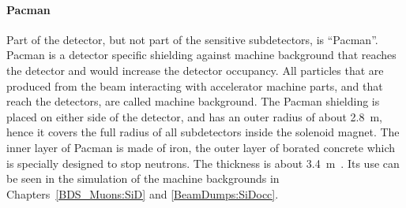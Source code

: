 \paragraph{Pacman}
Part of the detector, but not part of the sensitive subdetectors, is ``Pacman''.
Pacman is a detector specific shielding against machine background that reaches the detector and would increase the detector occupancy.
All particles that are produced from the beam interacting with accelerator machine parts, and that reach the detectors, are called machine background.
The Pacman shielding is placed on either side of the detector, and has an outer radius of about \SI{2.8}{\meter}, hence it covers the full radius of all subdetectors inside the solenoid magnet.
The inner layer of Pacman is made of iron, the outer layer of borated concrete which is specially designed to stop neutrons.
The thickness is about \SI{3.4}{\meter}~\cite{SiD_Geo}.
Its use can be seen in the simulation of the machine backgrounds in Chapters~\ref{BDS_Muons:SiD} and \ref{BeamDumps:SiDocc}.


